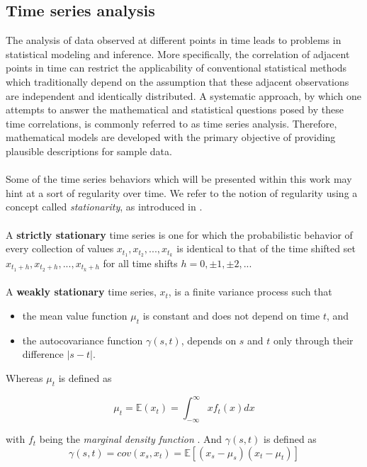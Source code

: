 \subsection{Time series analysis}

The analysis of data observed at different points in time leads to problems in statistical modeling and inference. 
More specifically, the correlation of adjacent points in time can restrict the applicability of conventional statistical methods which traditionally depend on the assumption that these adjacent observations are independent and identically distributed. 
A systematic approach, by which one attempts to answer the mathematical and statistical questions posed by these time correlations, is commonly referred to as time series analysis. 
Therefore, mathematical models are developed with the primary objective of providing plausible descriptions for sample data. \cite{shumway2000time}
\\
\\
Some of the time series behaviors which will be presented within this work may hint at a sort of regularity over time.
We refer to the notion of regularity using a concept called \textit{stationarity}, as introduced in \cite{shumway2000time}.
\\
\\
A \textbf{strictly stationary} time series is one for which the probabilistic behavior of every collection of values
${x_{t_1}, x_{t_2}, ..., x_{t_k}}$
is identical to that of the time shifted set
${x_{t_1+h}, x_{t_2+h}, ..., x_{t_k+h}}$
for all time shifts $h=0,\pm1,\pm2,...$
\\
\\
A \textbf{weakly stationary} time series, $x_t$, is a finite variance process such that
\begin{itemize}
    \item the mean value function $\mu_t$ is constant and does not depend on time $t$, and
    \item the autocovariance function $\gamma(s, t)$, depends on $s$ and $t$ only through their difference $|s-t|$.
\end{itemize}

Whereas $\mu_t$ is defined as

\begin{equation}
    \mu_{t}=\mathbb{E}(x_t)=\int_{-\infty}^{\infty} x f_t(x) dx
\end{equation}

with $f_t$ being the \textit{marginal density function} \cite{shumway2000time}.
And $\gamma(s, t)$ is defined as
\begin{equation}
    \gamma(s, t)=cov(x_s, x_t)=\mathbb{E}[(x_s-\mu_s)(x_t-\mu_t)]
\end{equation}

